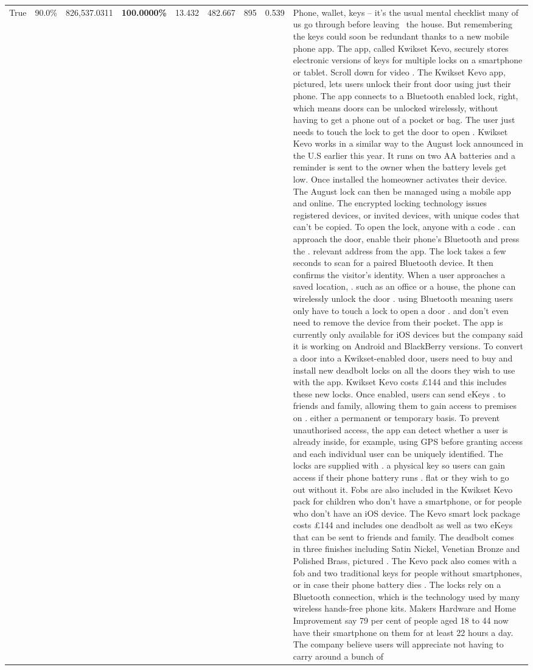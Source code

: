 \begin{table}[H]
\begin{tabular}{lllrlllll}
True & 90.0\% & 826,537.0311 & \bfseries \color{red} 100.0000\% & 13.432 & 482.667 & 895 & 0.539 & Phone, wallet, keys – it’s the usual mental checklist many of us go through before leaving  the house. But remembering the keys could soon be redundant thanks to a new mobile phone app. The app, called Kwikset Kevo, securely stores electronic versions of keys for multiple locks on a smartphone or tablet. Scroll down for video . The Kwikset Kevo app, pictured, lets users unlock their front door using just their phone. The app connects to a Bluetooth enabled lock, right, which means doors can be unlocked wirelessly, without having to get a phone out of a pocket or bag. The user just needs to touch the lock to get the door to open . Kwikset Kevo works in a similar way to the August lock announced in the U.S earlier this year. It runs on two AA batteries and a reminder is sent to the owner when the battery levels get low. Once installed the homeowner activates their device. The August lock can then be managed using a mobile app and online. The encrypted locking technology issues registered devices, or invited devices, with unique codes that can't be copied. To open the lock, anyone with a code . can approach the door, enable their phone's Bluetooth and press the . relevant address from the app. The lock takes a few seconds to scan for a paired Bluetooth device. It then confirms the visitor's identity. When a user approaches a saved location, . such as an office or a house, the phone can wirelessly unlock the door . using Bluetooth meaning users only have to touch a lock to open a door . and don't even need to remove the device from their pocket. The app is currently only available for iOS devices but the company said it is working on Android and BlackBerry versions. To convert a door into a Kwikset-enabled door, users need to buy and install new deadbolt locks on all the doors they wish to use with the app. Kwikset Kevo costs £144 and this includes these new locks. Once enabled, users can send eKeys . to friends and family, allowing them to gain access to premises on . either a permanent or temporary basis. To prevent unauthorised access, the app can detect whether a user is already inside, for example, using GPS before granting access and each individual user can be uniquely identified. The locks are supplied with . a physical key so users can gain access if their phone battery runs . flat or they wish to go out without it. Fobs are also included in the Kwikset Kevo pack for children who don't have a smartphone, or for people who don't have an iOS device. The Kevo smart lock package costs £144 and includes one deadbolt as well as two eKeys that can be sent to friends and family. The deadbolt comes in three finishes including Satin Nickel, Venetian Bronze and Polished Brass, pictured . The Kevo pack also comes with a fob and two traditional keys for people without smartphones, or in case their phone battery dies . The locks rely on a Bluetooth connection, which is the technology used by many wireless hands-free phone kits. Makers Hardware and Home Improvement say 79 per cent of people aged 18 to 44 now have their smartphone on them for at least 22 hours a day. The company believe users will appreciate not having to carry around a bunch of 
\end{tabular}
\end{table}
